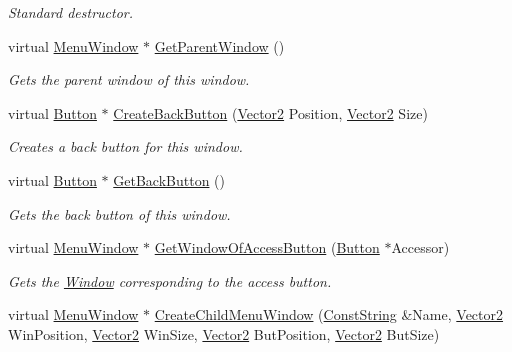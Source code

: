 \begin{DoxyCompactItemize}
\begin{DoxyCompactList}\small\item\em Standard destructor. \item\end{DoxyCompactList}\item 
virtual \hyperlink{classphys_1_1UI_1_1MenuWindow}{MenuWindow} $\ast$ \hyperlink{classphys_1_1UI_1_1MenuWindow_ac47ccc564f09ac33e13e56860b6ae281}{GetParentWindow} ()
\begin{DoxyCompactList}\small\item\em Gets the parent window of this window. \item\end{DoxyCompactList}\item 
virtual \hyperlink{classphys_1_1UI_1_1Button}{Button} $\ast$ \hyperlink{classphys_1_1UI_1_1MenuWindow_a843089ce4d442eab82baef23b1121f0d}{CreateBackButton} (\hyperlink{classphys_1_1Vector2}{Vector2} Position, \hyperlink{classphys_1_1Vector2}{Vector2} Size)
\begin{DoxyCompactList}\small\item\em Creates a back button for this window. \item\end{DoxyCompactList}\item 
virtual \hyperlink{classphys_1_1UI_1_1Button}{Button} $\ast$ \hyperlink{classphys_1_1UI_1_1MenuWindow_a7c286758bac0e21154f41a56d9da8c08}{GetBackButton} ()
\begin{DoxyCompactList}\small\item\em Gets the back button of this window. \item\end{DoxyCompactList}\item 
virtual \hyperlink{classphys_1_1UI_1_1MenuWindow}{MenuWindow} $\ast$ \hyperlink{classphys_1_1UI_1_1MenuWindow_a12b1586cd33bc03b5902018376878961}{GetWindowOfAccessButton} (\hyperlink{classphys_1_1UI_1_1Button}{Button} $\ast$Accessor)
\begin{DoxyCompactList}\small\item\em Gets the \hyperlink{classphys_1_1UI_1_1Window}{Window} corresponding to the access button. \item\end{DoxyCompactList}\item 
virtual \hyperlink{classphys_1_1UI_1_1MenuWindow}{MenuWindow} $\ast$ \hyperlink{classphys_1_1UI_1_1MenuWindow_ae395d4158bfd4aeb874657a90367683a}{CreateChildMenuWindow} (\hyperlink{namespacephys_a5ce5049f8b4bf88d6413c47b504ebb31}{ConstString} \&Name, \hyperlink{classphys_1_1Vector2}{Vector2} WinPosition, \hyperlink{classphys_1_1Vector2}{Vector2} WinSize, \hyperlink{classphys_1_1Vector2}{Vector2} ButPosition, \hyperlink{classphys_1_1Vector2}{Vector2} ButSize)

\end{DoxyCompactItemize}
